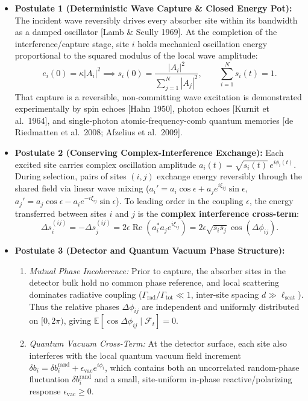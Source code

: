 \documentclass[11pt,a4paper]{article}
\begin{document}
\begin{itemize}[leftmargin=*]
    \item \textbf{Postulate 1 (Deterministic Wave Capture \& Closed Energy Pot):}
    The incident wave reversibly drives every absorber site within its bandwidth as a damped oscillator [Lamb \& Scully 1969]. At the completion of the interference/capture stage, site $i$ holds mechanical oscillation energy proportional to the squared modulus of the local wave amplitude:
    \begin{equation}
        e_i(0) = \kappa |A_i|^2 \implies s_i(0) = \frac{|A_i|^2}{\sum_{j=1}^N |A_j|^2}, \qquad \sum_{i=1}^N s_i(t) = 1.
    \end{equation}
    That capture is a reversible, non-committing wave excitation is demonstrated experimentally by spin echoes [Hahn 1950], photon echoes [Kurnit et al.\ 1964], and single-photon atomic-frequency-comb quantum memories [de Riedmatten et al.\ 2008; Afzelius et al.\ 2009].

    \item \textbf{Postulate 2 (Conserving Complex-Interference Exchange):}
    Each excited site carries complex oscillation amplitude $a_i(t) = \sqrt{s_i(t)}\,e^{i\phi_i(t)}$. During selection, pairs of sites $(i, j)$ exchange energy reversibly through the shared field via linear wave mixing ($a_i' = a_i\cos\epsilon + a_j e^{i\xi_{ij}}\sin\epsilon$, $a_j' = a_j\cos\epsilon - a_i e^{-i\xi_{ij}}\sin\epsilon$). To leading order in the coupling $\epsilon$, the energy transferred between sites $i$ and $j$ is the \textbf{complex interference cross-term}:
    \begin{equation}
        \Delta s_i^{(ij)} = -\Delta s_j^{(ij)} = 2\epsilon \operatorname{Re}\!\left(a_i^* a_j e^{i\xi_{ij}}\right) = 2\epsilon \sqrt{s_i s_j}\cos(\Delta\phi_{ij}).
    \end{equation}

    \item \textbf{Postulate 3 (Detector and Quantum Vacuum Phase Structure):}
    \begin{enumerate}
        \item \emph{Mutual Phase Incoherence:} Prior to capture, the absorber sites in the detector bulk hold no common phase reference, and local scattering dominates radiative coupling ($\Gamma_{\mathrm{rad}}/\Gamma_{\mathrm{tot}} \ll 1$, inter-site spacing $d \gg \ell_{\mathrm{scat}}$). Thus the relative phases $\Delta\phi_{ij}$ are independent and uniformly distributed on $[0, 2\pi)$, giving $\mathbb{E}[\cos\Delta\phi_{ij} \mid \mathcal{F}_t] = 0$.
        \item \emph{Quantum Vacuum Cross-Term:} At the detector surface, each site also interferes with the local quantum vacuum field increment $\delta b_i = \delta b_i^{\mathrm{rand}} + \epsilon_{\mathrm{vac}}e^{i\phi_i}$, which contains both an uncorrelated random-phase fluctuation $\delta b_i^{\mathrm{rand}}$ and a small, site-uniform in-phase reactive/polarizing response $\epsilon_{\mathrm{vac}} \ge 0$.
    \end{enumerate}


\end{itemize}
\end{document}
